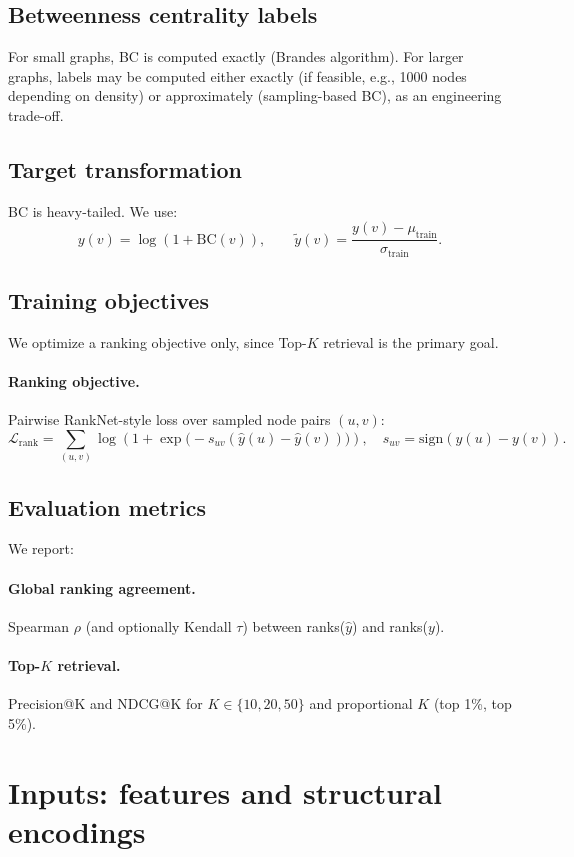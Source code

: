 \documentclass[11pt]{article}
\begin{document}
\subsection{Betweenness centrality labels}
For small graphs, BC is computed exactly (Brandes algorithm).
For larger graphs, labels may be computed either exactly (if feasible, e.g., 1000 nodes depending on density) or approximately (sampling-based BC), as an engineering trade-off.

\subsection{Target transformation}
BC is heavy-tailed. We use:
\[
y(v)=\log(1+\mathrm{BC}(v)),\qquad 
\tilde y(v)=\frac{y(v)-\mu_{\mathrm{train}}}{\sigma_{\mathrm{train}}}.
\]

\subsection{Training objectives}
We optimize a ranking objective only, since Top-$K$ retrieval is the primary goal.

\paragraph{Ranking objective.}
Pairwise RankNet-style loss over sampled node pairs $(u,v)$:
\[
\mathcal{L}_{\mathrm{rank}}
=\sum_{(u,v)}\log\!\left(1+\exp\!\big(-s_{uv}(\hat y(u)-\hat y(v))\big)\right),
\quad s_{uv}=\mathrm{sign}(y(u)-y(v)).
\]

\subsection{Evaluation metrics}
We report:

\paragraph{Global ranking agreement.}
Spearman $\rho$ (and optionally Kendall $\tau$) between ranks($\hat y$) and ranks($y$).

\paragraph{Top-$K$ retrieval.}
Precision@K and NDCG@K for $K\in\{10,20,50\}$ and proportional $K$ (top 1\%, top 5\%).

\section{Inputs: features and structural encodings}
\end{document}
